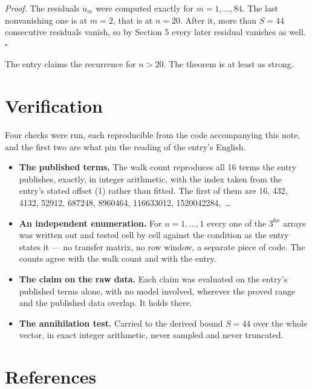 \documentclass[11pt]{article}
\theoremstyle{definition}
\begin{document}
{\itshape Proof.} The residuals $u_m$ were computed exactly for $m = 1,\dots,84$. The last nonvanishing one is at $m = 2$, that is at $n = 20$. After it, more than $S = 44$ consecutive residuals vanish, so by Section 5 every later residual vanishes as well. $\square$

The entry claims the recurrence for $n > 20$. The theorem is at least as strong.

\section{Verification}

Four checks were run, each reproducible from the code accompanying this note, and the first two are what pin the reading of the entry's English.

\begin{itemize}

\item {\bfseries The published terms.} The walk count reproduces all 16 terms the entry publishes, exactly, in integer arithmetic, with the index taken from the entry's stated offset (1) rather than fitted. The first of them are 16, 432, 4132, 52912, 687248, 8960464, 116633012, 1520042284,~\dots

\item {\bfseries An independent enumeration.} For $n = 1,\dots,1$ every one of the $3^{6n}$ arrays was written out and tested cell by cell against the condition as the entry states it --- no transfer matrix, no row window, a separate piece of code. The counts agree with the walk count and with the entry.

\item {\bfseries The claim on the raw data.} Each claim was evaluated on the entry's published terms alone, with no model involved, wherever the proved range and the published data overlap. It holds there.

\item {\bfseries The annihilation test.} Carried to the derived bound $S = 44$ over the whole vector, in exact integer arithmetic, never sampled and never truncated.

\end{itemize}

\section{References}
\end{document}
